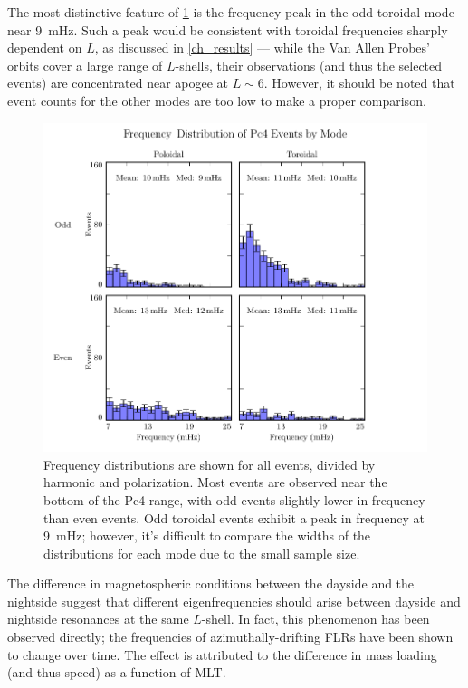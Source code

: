 The most distinctive feature of \cref{fig_f}
is the frequency peak in the odd toroidal mode near \SI{9}{\mHz}. 
Such a peak would be consistent with toroidal frequencies sharply dependent on
$L$, as discussed in \cref{ch_results} --- while the Van Allen Probes' orbits
cover a large range of $L$-shells, their observations (and thus the selected
events) are concentrated near apogee at $L \sim 6$. However, it should be noted
that event counts for the other modes are too low to make a proper comparison. 

\begin{figure}[!htb]
  \centering
  \includegraphics[width=\textwidth]{figures/f.pdf}
  \caption[Frequency Distribution of Pc4 Events by Mode]{
    Frequency distributions are shown for all events, divided by harmonic and
    polarization. Most events are observed near the bottom of the Pc4 range,
    with odd events slightly lower in frequency than even events. Odd toroidal
    events exhibit a peak in frequency at \about\SI{9}{\mHz}; however, it's
    difficult to compare the widths of the distributions for each mode due to
    the small sample size. 
  }
  \label{fig_f}
\end{figure}

The difference in magnetospheric conditions between the dayside and the
nightside suggest that different eigenfrequencies should arise between dayside
and nightside resonances at the same $L$-shell. In fact, this phenomenon has
been observed directly; the frequencies of azimuthally-drifting FLRs have been
shown to change over time\cite{motoba_2015}. The effect is attributed to the
difference in mass loading (and thus \Alfven speed) as a function of MLT. 

